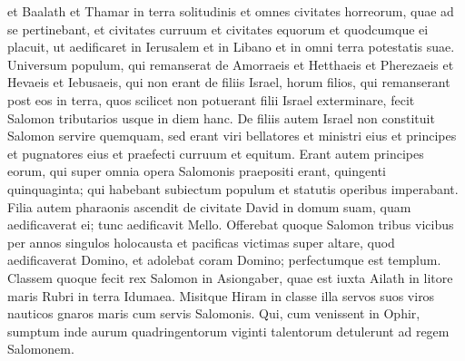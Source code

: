 \begin{biblechapter}
\verse et Baalath et Thamar in terra solitudinis 
\verse et omnes civitates horreorum, quae ad se pertinebant, et civitates curruum et civitates equorum et quodcumque ei placuit, ut aedificaret in Ierusalem et in Libano et in omni terra potestatis suae. 
\verse Universum populum, qui remanserat de Amorraeis et Hetthaeis et Pherezaeis et Hevaeis et Iebusaeis, qui non erant de filiis Israel, 
\verse horum filios, qui remanserant post eos in terra, quos scilicet non potuerant filii Israel exterminare, fecit Salomon tributarios usque in diem hanc. 
\verse De filiis autem Israel non constituit Salomon servire quemquam, sed erant viri bellatores et ministri eius et principes et pugnatores eius et praefecti curruum et equitum. 
\verse Erant autem principes eorum, qui super omnia opera Salomonis praepositi erant, quingenti quinquaginta; qui habebant subiectum populum et statutis operibus imperabant. 
\verse Filia autem pharaonis ascendit de civitate David in domum suam, quam aedificaverat ei; tunc aedificavit Mello. 
\verse Offerebat quoque Salomon tribus vicibus per annos singulos holocausta et pacificas victimas super altare, quod aedificaverat Domino, et adolebat coram Domino; perfectumque est templum. 
\verse Classem quoque fecit rex Salomon in Asiongaber, quae est iuxta Ailath in litore maris Rubri in terra Idumaea. 
\verse Misitque Hiram in classe illa servos suos viros nauticos gnaros maris cum servis Salomonis. 
\verse Qui, cum venissent in Ophir, sumptum inde aurum quadringentorum viginti talentorum detulerunt ad regem Salomonem. 
\end{biblechapter}


